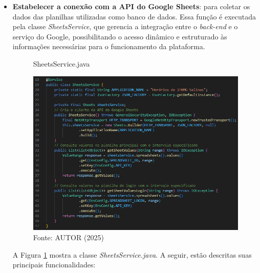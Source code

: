 \begin{itemize}
    \item \textbf{Estabelecer a conexão com a API do Google Sheets}: para coletar os dados das planilhas utilizadas como banco de dados. Essa função é executada pela classe \textit{SheetsService}, que gerencia a integração entre o \textit{back-end} e o serviço do Google, possibilitando o acesso dinâmico e estruturado às informações necessárias para o funcionamento da plataforma.
    
    \begin{figure}[H]
        \centering
        \caption{SheetsService.java}
        \includegraphics[width=1\textwidth]{Figuras/back-2.png}
        \caption*{Fonte: AUTOR (2025)}
        \label{fig_back_2}
    \end{figure}
    
    A Figura \ref{fig_back_2} mostra a classe \textit{SheetsService.java}. A seguir, estão descritas suas principais funcionalidades:


\end{itemize}
